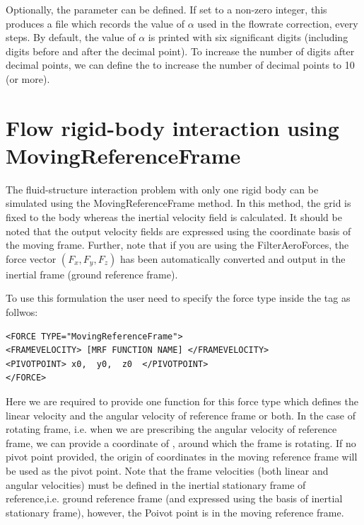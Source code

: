 Optionally, the  parameter can be defined. If set to a
non-zero integer, this produces a file  which records the
value of $\alpha$ used in the flowrate correction, every 
steps. By default, the value of $\alpha$ is printed with six significant
digits (including digits before and after the decimal point). To increase the
number of digits after decimal points, we can define the 
 to increase the number of decimal points 
to 10 (or more).

\section{Flow rigid-body interaction using MovingReferenceFrame}
The fluid-structure interaction problem with only one rigid body can be simulated using the MovingReferenceFrame method. In this method, the grid is fixed to the body whereas the inertial velocity field is calculated. It should be noted that the output velocity fields are expressed using the coordinate basis of the moving frame. Further, note that if you are using the FilterAeroForces, the force vector $\left(F_x, F_y, F_z\right)$ has been automatically converted and output in the inertial frame (ground reference frame).

To use this formulation the user need to specify the force type inside the  tag as follwos:

\begin{lstlisting}[style=XMLStyle]
<FORCE TYPE="MovingReferenceFrame">
<FRAMEVELOCITY> [MRF FUNCTION NAME] </FRAMEVELOCITY>
<PIVOTPOINT> x0,  y0,  z0  </PIVOTPOINT>
</FORCE>
\end{lstlisting}

Here we are required to provide one function for this force type which defines the linear velocity and the angular velocity of reference frame or both. In the case of rotating frame, i.e. when we are prescribing the angular velocity of reference frame, we can provide a coordinate of , around which the frame is rotating. If no pivot point provided, the origin of coordinates in the moving reference frame will be used as the pivot point.
Note that the frame velocities (both linear and angular velocities) must be defined in the inertial stationary frame of reference,i.e. ground reference frame (and expressed using the basis of inertial stationary frame), however, the Poivot point is in the moving reference frame.

